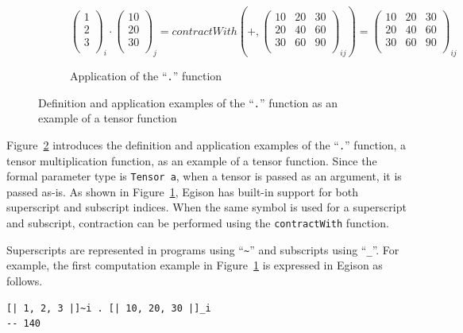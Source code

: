 \begin{figure}[t]
\begin{subfigure}[b]{1.0\linewidth}
{  \\ \medskip \\
  $\begin{pmatrix} 1 \\ 2 \\ 3 \\ \end{pmatrix}_{i} \cdot \begin{pmatrix} 10 \\ 20 \\ 30 \\ \end{pmatrix}_{j} = contractWith(+, \begin{pmatrix} 10 & 20 & 30 \\ 20 & 40 & 60 \\ 30 & 60 & 90 \\ \end{pmatrix}_{ij})
  = \begin{pmatrix} 10 & 20 & 30 \\ 20 & 40 & 60 \\ 30 & 60 & 90 \\ \end{pmatrix}_{ij}$ \\
  }
  \caption{Application of the ``\lstinline{.}'' function}
  \label{fig:dotApp}
 \end{subfigure}
 \caption{Definition and application examples of the ``\lstinline{.}'' function as an example of a tensor function}
 \label{fig:dotFunction}
\end{figure}

Figure~\ref{fig:dotFunction} introduces the definition and application examples of the ``\lstinline{.}'' function, a tensor multiplication function, as an example of a tensor function.
Since the formal parameter type is \lstinline{Tensor a}, when a tensor is passed as an argument, it is passed as-is.
As shown in Figure~\ref{fig:dotApp}, Egison has built-in support for both superscript and subscript indices.
When the same symbol is used for a superscript and subscript, contraction can be performed using the \lstinline{contractWith} function.

Superscripts are represented in programs using ``\lstinline|~|'' and subscripts using ``\lstinline|_|''.
For example, the first computation example in Figure~\ref{fig:dotApp} is expressed in Egison as follows.
\begin{lstlisting}[language=egison,numbers=none]
[| 1, 2, 3 |]~i . [| 10, 20, 30 |]_i
-- 140
\end{lstlisting}

